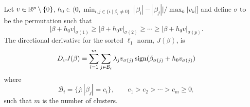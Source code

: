 \begin{theorem}
  \label{thm:sl1-directional-derivative}
  Let $v \in \mathbb{R}^p \setminus \{0\}$, \(h_0 \in \big(0, \min_{i,j \in
    \{i \mid \beta_i \neq 0\}}\big| |\beta_i| - |\beta_j| \big|/\max_k|v_k| \big]\) and
  define \(\sigma\) to be the permutation such that
  \[
    |\beta + h_0v|_{\sigma(1)} \geq |\beta + h_0v |_{\sigma(2)}
    \geq \cdots \geq |\beta + h_0v|_{\sigma(p)}.
  \]
  The directional derivative for the sorted \(\ell_1\) norm, \(J(\beta)\), is
  \[
    D_v J(\beta) =
    \sum_{i=1}^m \sum_{j \in \mathcal{B}_i} \lambda_j v_{\sigma(j)}\operatorname{sign}(\beta_{\sigma(j)} + h_0v_{\sigma(j)})\]
  where
  \[
    \mathcal{B}_i = \{j : |\beta_j| = c_i\},\qquad
    c_1 > c_2 > \cdots > c_m \geq 0,
  \]
  such that \(m\) is the number of clusters.
\end{theorem}
